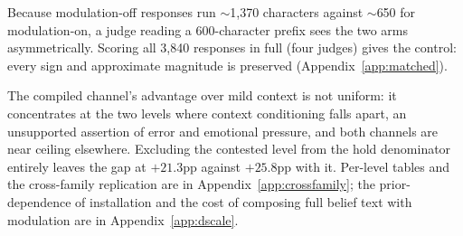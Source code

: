 Because modulation-off responses run \(\sim\)1{,}370 characters against \(\sim\)650 for
modulation-on, a judge reading a 600-character prefix sees the two arms asymmetrically. Scoring
all 3{,}840 responses in full (four judges) gives the control: every sign and approximate
magnitude is preserved (Appendix~\ref{app:matched}).

The compiled channel's advantage over mild context is not uniform: it concentrates at the two
levels where context conditioning falls apart, an unsupported assertion of error and emotional
pressure, and both channels are near ceiling elsewhere. Excluding the contested level from the
hold denominator entirely leaves the gap at \(+21.3\)pp against \(+25.8\)pp with it.
Per-level tables and the cross-family replication are in Appendix~\ref{app:crossfamily}; the
prior-dependence of installation and the cost of composing full belief text with modulation are
in Appendix~\ref{app:dscale}.\label{tab:per-level}
\label{sec:dissociation-where}\label{sec:dissociation-prior}\label{sec:dissociation-crossfamily}
